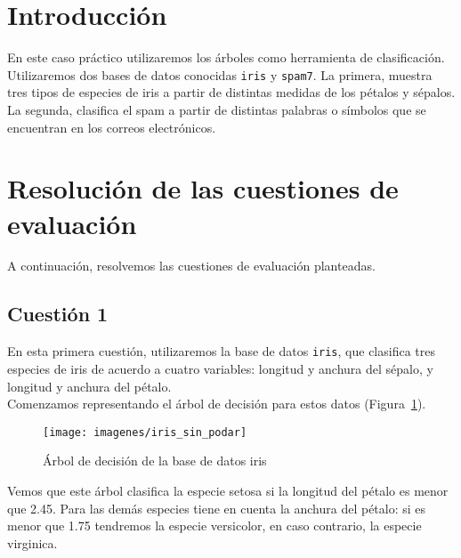 \documentclass[12pt,a4paper,twoside,openright,titlepage,final]{article}
\author{José Ignacio Escribano}
\title{}
\begin{document}
\setcounter{page}{1}


\listoffigures
\thispagestyle{empty}
\newpage

\listoftables
\thispagestyle{empty}
\newpage

\tableofcontents
\thispagestyle{empty}
\newpage


\setcounter{page}{1}

\section{Introducción}

En este caso práctico utilizaremos los árboles como herramienta de clasificación. Utilizaremos dos bases de datos conocidas \texttt{iris} y \texttt{spam7}. La primera, muestra tres tipos de especies de iris a partir de distintas medidas de los pétalos y sépalos. La segunda, clasifica el spam a partir de distintas palabras o símbolos que se encuentran en los correos electrónicos.

\section{Resolución de las cuestiones de evaluación}

A continuación, resolvemos las cuestiones de evaluación planteadas.

\subsection{Cuestión 1}

En esta primera cuestión, utilizaremos la base de datos \texttt{iris}, que clasifica tres especies de iris de acuerdo a cuatro variables: longitud y anchura del sépalo, y longitud y anchura del pétalo.\\

Comenzamos representando el árbol de decisión para estos datos (Figura~\ref{fig:iris_sin_podar}).\\

\begin{figure}[tbph!]
\centering
\texttt{[image: imagenes/iris\_sin\_podar]}
\caption{Árbol de decisión de la base de datos iris}
\label{fig:iris_sin_podar}
\end{figure}

Vemos que este árbol clasifica la especie setosa si la longitud del pétalo es menor que 2.45. Para las demás especies tiene en cuenta la anchura del pétalo: si es menor que 1.75 tendremos la especie versicolor, en caso contrario, la especie virginica.\\
\end{document}
